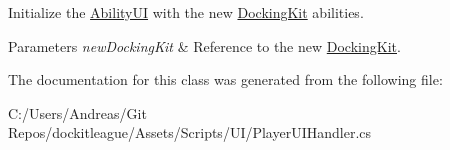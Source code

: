 Initialize the \hyperlink{class_ability_u_i}{Ability\+UI} with the new \hyperlink{class_docking_kit}{Docking\+Kit} abilities. 


\begin{DoxyParams}{Parameters}
{\em new\+Docking\+Kit} & Reference to the new \hyperlink{class_docking_kit}{Docking\+Kit}.\\
\hline
\end{DoxyParams}


The documentation for this class was generated from the following file\+:\begin{DoxyCompactItemize}
\item 
C\+:/\+Users/\+Andreas/\+Git Repos/dockitleague/\+Assets/\+Scripts/\+U\+I/Player\+U\+I\+Handler.\+cs\end{DoxyCompactItemize}
